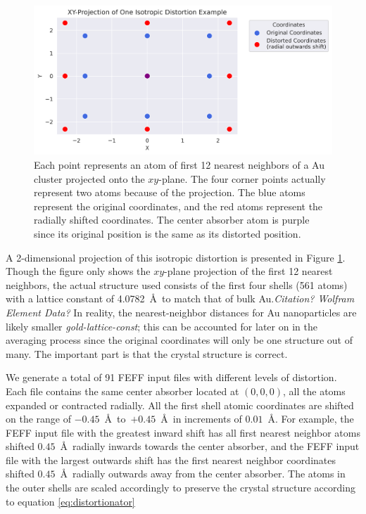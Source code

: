 \begin{figure}[h]
	\centering
	\includegraphics[width=\linewidth]{Chapters/Figures/2d_distortion_example.png}
	\caption[2D Distortion]{Each point represents an atom of first 12 nearest neighbors of a Au cluster projected onto the $xy$\nobreakdash-plane. The four corner points actually represent two atoms because of the projection. The blue atoms represent the original coordinates, and the red atoms represent the radially shifted coordinates. The center absorber atom is purple since its original position is the same as its distorted position.}
	\label{fig:2d-distortion}
\end{figure}

A 2-dimensional projection of this isotropic distortion is presented in Figure \ref{fig:2d-distortion}. Though the figure only shows the $xy$\nobreakdash-plane projection of the first 12 nearest neighbors, the actual structure used consists of the first four shells (561 atoms) with a lattice constant of 4.0782~\AA~to match that of bulk Au.\textit{Citation? Wolfram Element Data?} In reality, the nearest-neighbor distances for Au nanoparticles are likely smaller \textit{gold-lattice-const}; this can be accounted for later on in the averaging process since the original coordinates will only be one structure out of many. The important part is that the crystal structure is correct. 

We generate a total of 91 FEFF input files with different levels of distortion. Each file contains the same center absorber located at $ (0,0,0) $, all the atoms expanded or contracted radially. All the first shell atomic coordinates are shifted on the range of $ -0.45 $~\AA~to~$ +0.45 $~\AA~in increments of $ 0.01 $~\AA. For example, the FEFF input file with the greatest inward shift has all first nearest neighbor atoms shifted $ 0.45 $~\AA~radially inwards towards the center absorber, and the FEFF input file with the largest outwards shift has the first nearest neighbor coordinates shifted $ 0.45 $~\AA~radially outwards away from the center absorber. The atoms in the outer shells are scaled accordingly to preserve the crystal structure according to equation \ref{eq:distortionator}

